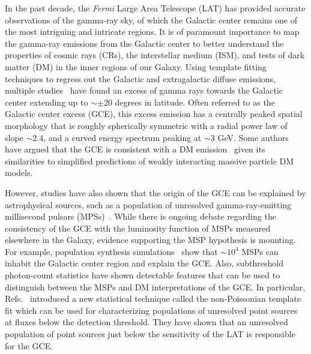 \documentclass[doublespace,nopageskip]{VTthesis} %
\begin{document}
In the past decade, the \emph{Fermi} Large Area Telescope (LAT) has provided accurate observations of the gamma-ray sky, of which the Galactic center remains one of the most intriguing and intricate regions. It is of paramount importance to map the gamma-ray emissions from the Galactic center to better understand the properties of cosmic rays (CRs), the interstellar medium (ISM), and tests of dark matter (DM) in the inner regions of our Galaxy. Using template fitting techniques to regress out the Galactic and extragalactic diffuse emissions, multiple studies~\cite{2009arXiv0910.2998G,2009arXiv0912.3828V,2011PhLB..697..412H,2012PhRvD..86h3511A,2013PhRvD..88h3521G,2014PhRvD..89f3515M,2013PDU.....2..118H,2014PhRvD..90b3526A,2016PDU....12....1D,2015JCAP...03..038C,2015PhRvD..91l3010Z,2016ApJ...819...44A,2017ApJ...840...43A} have found an excess of gamma rays towards the Galactic center extending up to $\sim\pm$20 degrees in latitude. Often referred to as the Galactic center excess (GCE), this excess emission has a centrally peaked spatial morphology that is roughly spherically symmetric with a radial power law of slope $\sim$2.4, and a curved energy spectrum peaking at $\sim$3 GeV. Some authors have argued that the GCE is consistent with a DM emission~\cite{2009arXiv0910.2998G,2012PhRvD..86h3511A,2013PhRvD..88h3521G,2014PhRvD..89f3515M,2015JCAP...03..038C,2016PDU....12....1D} given its similarities to simplified predictions of weakly interacting massive particle DM models.

However, studies have also shown that the origin of the GCE can be explained by astrophysical sources, such as a population of unresolved gamma-ray-emitting millisecond pulsars (MPSs)~\cite{2011JCAP...03..010A,2012PhRvD..86h3511A,2013PhRvD..88h3521G,2014PhRvD..89f3515M,2015JCAP...03..038C,2016PDU....12....1D}. While there is ongoing debate regarding the consistency of the GCE with the luminosity function of MSPs measured elsewhere in the Galaxy\cite{2015JCAP...06..043C, 2016JCAP...03..049H, 2017JCAP...08..015P, 2018MNRAS.481.3966B}, evidence supporting the MSP hypothesis is mounting. For example, population synthesis simulations~\cite{2018ApJ...863..199G} show that $\sim 10^4$ MSPs can inhabit the Galactic center region and explain the GCE. Also, subthreshold photon-count statistics have shown detectable features that can be used to distinguish between the MSPs and DM interpretations of the GCE. In particular, Refs.~\cite{2016PhRvL.116e1103L,2017AJ....153..253M} introduced a new statistical technique called the non-Poissonian template fit which can be used for characterizing populations of unresolved point sources at fluxes below the detection threshold. They have shown that an unresolved population of point sources just below the sensitivity of the LAT is responsible for the GCE.
\end{document}
